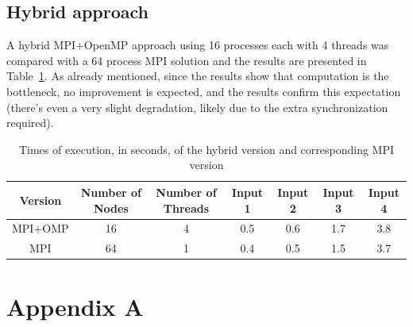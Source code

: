 \documentclass{article}
\begin{document}
\subsection{Hybrid approach}

A hybrid MPI+OpenMP approach using 16 processes each with 4 threads was compared with a 64 process
MPI solution and the results are presented in Table~\ref{tbl:hybrid-results}. As already mentioned, since the results show that computation
is the bottleneck, no improvement is expected, and the results confirm this expectation
(there's even a very slight degradation, likely due to the extra
synchronization required).

\begin{table}[h!]
	\centering
	\begin{tabular}{||c c c c c c c||} 
	 \hline
	 Version & Number of Nodes & Number of Threads & Input 1 & Input 2 & Input 3 & Input 4\\ [0.5ex] 
	 \hline\hline
	  MPI+OMP & 16 & 4 & 0.5 & 0.6 & 1.7 & 3.8 \\  [1ex] 
	 \hline
	  MPI & 64 & 1 & 0.4 & 0.5 & 1.5 & 3.7 \\  [1ex] 
	 \hline
	\end{tabular}
	\caption{Times of execution, in seconds, of the hybrid version and corresponding MPI version}
	\label{tbl:hybrid-results}
\end{table}

\newpage

\section{Appendix A}
\end{document}
